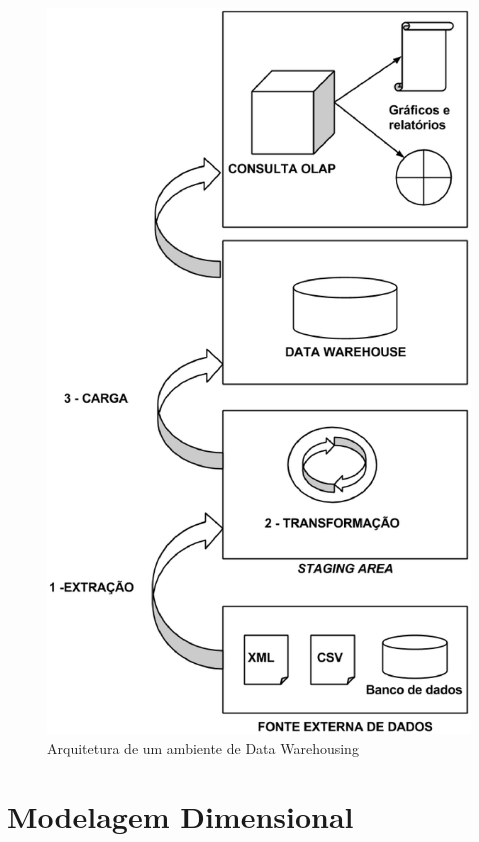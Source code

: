 \begin{figure}[h!]
\centering
\includegraphics[keepaspectratio=false,scale=0.50]{figuras/figuras_matheus/etl.eps}
\caption{Arquitetura de um ambiente de Data Warehousing}
\label{fig:etl}
\end{figure}
\FloatBarrier


\section{Modelagem Dimensional}

